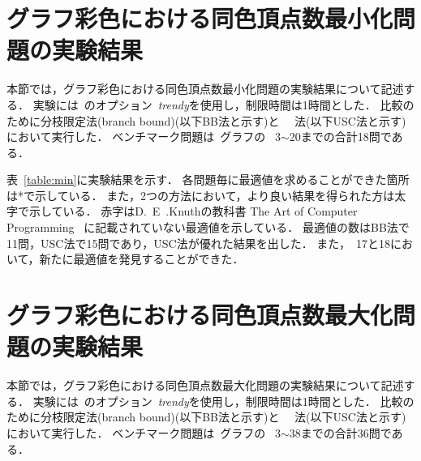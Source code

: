\begin{table}[tb]
  \begin{minipage}[t]{0.45\linewidth}
    \centering
  \end{minipage}
  \begin{minipage}[t]{0.45\linewidth}
    \centering
  \end{minipage}
\end{table}

\begin{table}[tb]
  \centering
\end{table}

\section{グラフ彩色における同色頂点数最小化問題の実験結果}

本節では，グラフ彩色における同色頂点数最小化問題の実験結果について記述する．
実験には~{\clingo}のオプション~\textit{trendy}を使用し，制限時間は1時間とした．
比較のために分枝限定法(branch bound)(以下BB法と示す)と
~~法(以下USC法と示す)において実行した．
ベンチマーク問題は~グラフの
~3$\sim$20までの合計18問である．

表~\ref{table:min}に実験結果を示す．
各問題毎に最適値を求めることができた箇所は*で示している．
また，2つの方法において，より良い結果を得られた方は太字で示している．
赤字はD.~E~.Knuthの教科書
The Art of Computer Programming~\cite{Knuth:TAOCP:SAT}
に記載されていない最適値を示している．
最適値の数はBB法で11問，USC法で15問であり，USC法が優れた結果を出した．
また，~17と18において，新たに最適値を発見することができた．


\section{グラフ彩色における同色頂点数最大化問題の実験結果}

本節では，グラフ彩色における同色頂点数最大化問題の実験結果について記述する．
実験には~{\clingo}のオプション~\textit{trendy}を使用し，制限時間は1時間とした．
比較のために分枝限定法(branch bound)(以下BB法と示す)と
~~法(以下USC法と示す)において実行した．
ベンチマーク問題は~グラフの
~3$\sim$38までの合計36問である．

